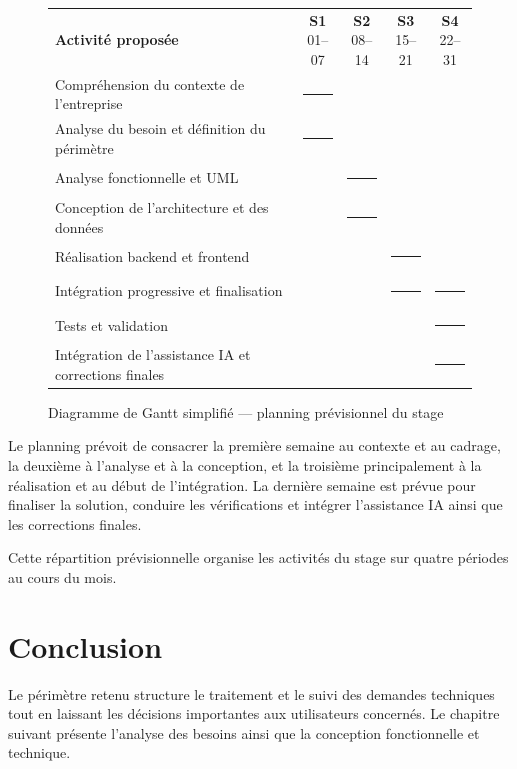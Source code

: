 \begin{figure}[htbp]
\centering
\small
\renewcommand{\arraystretch}{1.35}
\begin{tabular}{p{}cccc}
\textbf{Activité proposée} & \shortstack{\textbf{S1}\\01--07} & \shortstack{\textbf{S2}\\08--14} & \shortstack{\textbf{S3}\\15--21} & \shortstack{\textbf{S4}\\22--31} \\
Compréhension du contexte de l'entreprise & \rule{1.5em}{0.65em} & & & \\
Analyse du besoin et définition du périmètre & \rule{1.5em}{0.65em} & & & \\
Analyse fonctionnelle et UML & & \rule{1.5em}{0.65em} & & \\
Conception de l'architecture et des données & & \rule{1.5em}{0.65em} & & \\
Réalisation backend et frontend & & & \rule{1.5em}{0.65em} & \\
Intégration progressive et finalisation & & & \rule{1.5em}{0.65em} & \rule{1.5em}{0.65em} \\
Tests et validation & & & & \rule{1.5em}{0.65em} \\
Intégration de l'assistance IA et corrections finales & & & & \rule{1.5em}{0.65em} \\
\end{tabular}
\normalsize
\captionsetup{aboveskip=8pt,belowskip=8pt}
\caption{Diagramme de Gantt simplifié --- planning prévisionnel du stage}
\label{fig:01-planning-previsionnel}
\end{figure}

Le planning prévoit de consacrer la première semaine au contexte et au cadrage, la deuxième à l'analyse et à la conception, et la troisième principalement à la réalisation et au début de l'intégration. La dernière semaine est prévue pour finaliser la solution, conduire les vérifications et intégrer l'assistance IA ainsi que les corrections finales.

Cette répartition prévisionnelle organise les activités du stage sur quatre périodes au cours du mois.

\begingroup
\titlespacing*{\section}{0pt}{1.2ex}{0.8ex}
\section*{Conclusion}
\endgroup
{}
{}

Le périmètre retenu structure le traitement et le suivi des demandes techniques tout en laissant les décisions importantes aux utilisateurs concernés. Le chapitre suivant présente l'analyse des besoins ainsi que la conception fonctionnelle et technique.
